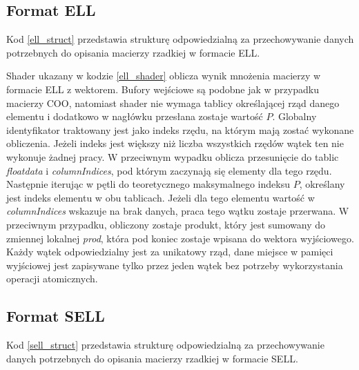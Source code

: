 \pagebreak

\subsection{Format ELL}
\label{cha:ell_impl}

Kod \ref{ell_struct} przedstawia strukturę odpowiedzialną za przechowywanie danych potrzebnych do opisania macierzy rzadkiej w formacie ELL.

Shader ukazany w kodzie \ref{ell_shader} oblicza wynik mnożenia macierzy w formacie ELL z wektorem.
Bufory wejściowe są podobne jak w przypadku macierzy COO, natomiast shader nie wymaga tablicy określającej rząd danego elementu i dodatkowo w nagłówku przesłana zostaje wartość $P$.
Globalny identyfikator traktowany jest jako indeks rzędu, na którym mają zostać wykonane obliczenia.
Jeżeli indeks jest większy niż liczba wszystkich rzędów wątek ten nie wykonuje żadnej pracy.
W przeciwnym wypadku oblicza przesunięcie do tablic \textit{floatdata} i \textit{columnIndices}, pod którym zaczynają się elementy dla tego rzędu.
Następnie iterując w pętli do teoretycznego maksymalnego indeksu $P$, określany jest indeks elementu w obu tablicach.
Jeżeli dla tego elementu wartość w \textit{columnIndices} wskazuje na brak danych, praca tego wątku zostaje przerwana.
W przeciwnym przypadku, obliczony zostaje produkt, który jest sumowany do zmiennej lokalnej \textit{prod}, która pod koniec zostaje wpisana do wektora wyjściowego.
Każdy wątek odpowiedzialny jest za unikatowy rząd, dane miejsce w pamięci wyjściowej jest zapisywane tylko przez jeden wątek bez potrzeby wykorzystania operacji atomicznych.

\pagebreak

\subsection{Format SELL}
\label{cha:sell_impl}

Kod \ref{sell_struct} przedstawia strukturę odpowiedzialną za przechowywanie danych potrzebnych do opisania macierzy rzadkiej w formacie SELL.


